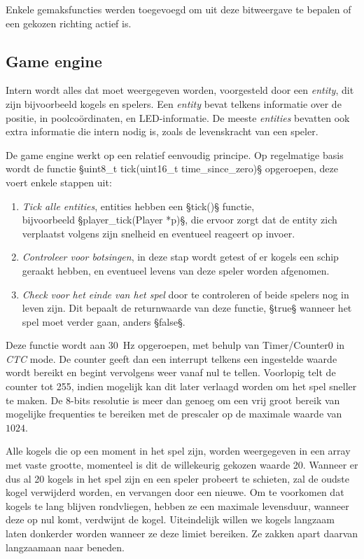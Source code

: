 \documentclass[12pt]{ugentreport}
\begin{document}
Enkele gemaksfuncties werden toegevoegd om uit deze bitweergave te bepalen of
een gekozen richting actief is.

\subsection{Game engine}
Intern wordt alles dat moet weergegeven worden, voorgesteld door een
\emph{entity}, dit zijn bijvoorbeeld kogels en spelers. Een \emph{entity} bevat
telkens informatie over de positie, in poolcoördinaten, en LED-informatie. De
meeste \emph{entities} bevatten ook extra informatie die intern nodig is, zoals
de levenskracht van een speler.

De game engine werkt op een relatief eenvoudig principe.
Op regelmatige basis wordt de functie §uint8_t tick(uint16_t time_since_zero)§
opgeroepen, deze voert enkele stappen uit:
\begin{enumerate}
\item \emph{Tick alle entities}, entities hebben een §tick()§ functie,\\
  bijvoorbeeld §player_tick(Player *p)§, die ervoor zorgt dat de entity zich
  verplaatst volgens zijn snelheid en eventueel reageert op invoer.

\item \emph{Controleer voor botsingen}, in deze stap wordt getest of er
  kogels een schip geraakt hebben, en eventueel levens van deze speler worden
  afgenomen.

\item \emph{Check voor het einde van het spel} door te controleren of beide
  spelers nog in leven zijn. Dit bepaalt de returnwaarde van deze functie,
  §true§ wanneer het spel moet verder gaan, anders §false§.
\end{enumerate}

Deze functie wordt aan \SI{30}{\hertz} opgeroepen, met behulp van
Timer/Counter0 in \emph{CTC} mode. De counter geeft dan een interrupt
telkens een ingestelde waarde wordt bereikt en begint vervolgens weer vanaf nul
te tellen. Voorlopig telt de counter tot \num{255}, indien mogelijk kan dit
later verlaagd worden om het spel sneller te maken.
De 8-bits resolutie is meer dan genoeg om een vrij
groot bereik van mogelijke frequenties te bereiken met de prescaler op de
maximale waarde van $1024$.

Alle kogels die op een moment in het spel zijn, worden weergegeven in een array
met vaste grootte, momenteel is dit de willekeurig gekozen waarde 20. Wanneer
er dus al 20 kogels in het spel zijn en een speler probeert te schieten, zal de
oudste kogel verwijderd worden, en vervangen door een nieuwe. Om te voorkomen
dat kogels te lang blijven rondvliegen, hebben ze een maximale levensduur,
wanneer deze op nul komt, verdwijnt de kogel. Uiteindelijk willen we kogels
langzaam laten donkerder worden wanneer ze deze limiet bereiken. Ze zakken apart
daarvan langzaamaan naar beneden.
\end{document}

